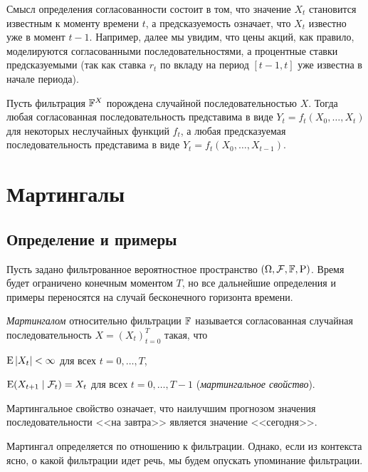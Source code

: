 Смысл определения согласованности состоит в том, что значение $X_t$ становится известным к моменту времени $t$, а предсказуемость означает, что $X_t$ известно уже в момент $t-1$.
Например, далее мы увидим, что цены акций, как правило, моделируются согласованными последовательностями, а процентные ставки предсказуемыми (так как ставка $r_t$ по вкладу на период $[t-1,t]$ уже известна в начале периода).

\begin{proposition}
Пусть фильтрация $\mathbb{F}^X$ порождена случайной последовательностью $X$.
Тогда любая согласованная последовательность представима в виде $Y_t = f_t(X_0,\dots,X_t)$ для некоторых неслучайных функций $f_t$, а любая предсказуемая последовательность представима в виде $Y_t = f_t(X_0,\dots,X_{t-1})$.
\end{proposition}


\section{Мартингалы}
\subsection{Определение и примеры}

Пусть задано фильтрованное вероятностное пространство $(\Omega,\mathcal{F},\mathbb{F},\mathrm{P})$.
Время будет ограничено конечным моментом $T$, но все дальнейшие определения и примеры переносятся на случай бесконечного горизонта времени.

\begin{definition}
\emph{Мартингалом} относительно фильтрации $\mathbb{F}$ называется согласованная случайная последовательность $X=(X_t)_{t=0}^T$ такая, что
\begin{alphenum}
\item $\operatorname{E}|X_t|<\infty$ для всех $t=0,\dots,T$,
\item $\operatorname{E}(X_{t+1}\mid \mathcal{F}_t) = X_t$ для всех $t=0,\dots,T-1$ (\emph{мартингальное свойство}).
\end{alphenum}
\end{definition}

Мартингальное свойство означает, что наилучшим прогнозом значения последовательности <<на завтра>> является значение <<сегодня>>.

\begin{remark}
Мартингал определяется по отношению к фильтрации.
Однако, если из контекста ясно, о какой фильтрации идет речь, мы будем опускать упоминание фильтрации.
\end{remark}

